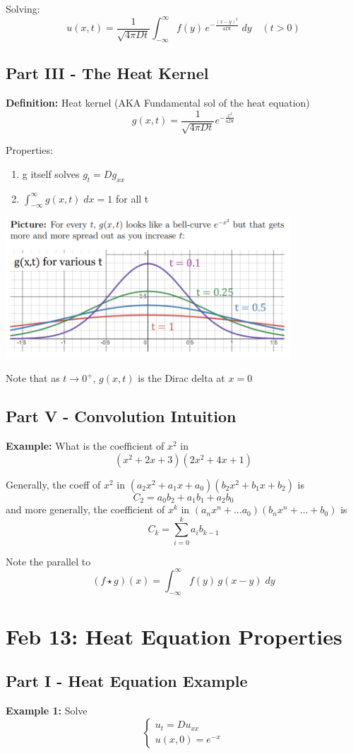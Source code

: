 \documentclass[12pt]{article}
\newcommand{\ans}[1]{\boxed{\text{#1}}}
\begin{document}
Solving:
\[\ans{$u(x, t) = \frac{1}{\sqrt{4\pi Dt}} \int_{-\infty}^\infty f(y)\, e^{-\frac{(x - y)^2}{4Dt}}\; dy$} \quad (t > 0)\]

\subsection*{Part III - The Heat Kernel}
\textbf{Definition:} Heat kernel (AKA Fundamental sol of the heat equation)
\[g(x, t) = \frac{1}{\sqrt{4\pi Dt}}e^{-\frac{x^2}{4Dt}}\]

Properties:
\begin{enumerate}
    \item g itself solves $g_t = Dg_{xx}$
    \item $\int_{-\infty}^\infty g(x, t) \; dx = 1$ for all t 
\end{enumerate}

\includegraphics[width=0.8\textwidth]{Images/heat kernel.png}

Note that as $t \to 0^+$, $g(x, t)$ is the Dirac delta at $x = 0$

\subsection*{Part V - Convolution Intuition}
\textbf{Example:} What is the coefficient of $x^2$ in 
\[(x^2 + 2x + 3)(2x^2 + 4x + 1)\]

Generally, the coeff of $x^2$ in $(a_2x^2 + a_1x + a_0)(b_2x^2+ b_1x + b_2)$ is 
\[C_2 = a_0 b_2 + a_1 b_1 + a_2 b_0\] 
and more generally, the coefficient of $x^k$ in $(a_nx^n + ... a_0)(b_nx^n + ... + b_0)$ is 
\[C_k = \sum_{i=0}^k a_i b_{k-1}\]

Note the parallel to 
\[(f \star g)(x) = \int_{-\infty}^\infty f(y)\, g(x -y) \; dy\]

\section{Feb 13: Heat Equation Properties}
\subsection*{Part I - Heat Equation Example}
\textbf{Example 1:} Solve 
\[\begin{cases}
    u_t = Du_{xx}\\
    u(x, 0) = e^{-x}
\end{cases}\]
\end{document}

